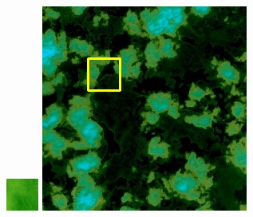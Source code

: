 \documentclass[10pt]{ctexart}
\begin{document}
\begin{figure}[H]
{{\begin{minipage}[b]{0.15\linewidth}
            \includegraphics[width=1\linewidth]{../log/spoon2/cut/tmp_cut_LC81321192014054LGN00_03055_spectral.jpg}\vspace{4pt}
            \includegraphics[width=1\linewidth]{../log/spoon2/cut/LC80350192014190LGN00_06561_spectral.jpg}\vspace{4pt}

\end{minipage}}}
\end{figure}
\end{document}
